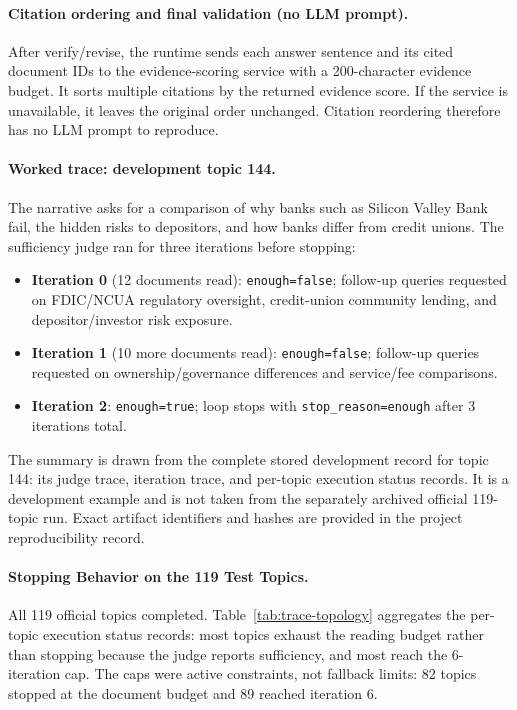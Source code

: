 \paragraph{Citation ordering and final validation (no LLM prompt).}
After verify/revise, the runtime sends each answer sentence and its
cited document IDs to the evidence-scoring service with a 200-character
evidence budget. It sorts multiple citations by the returned evidence
score. If the service is unavailable, it leaves the original order
unchanged. Citation reordering therefore has no LLM prompt to
reproduce.

\paragraph{Worked trace: development topic 144.} The narrative asks for
a comparison of why banks such as Silicon Valley Bank fail, the hidden
risks to depositors, and how banks differ from credit unions. The
sufficiency judge ran for three iterations before stopping:

\begin{itemize}
\setlength\itemsep{2pt}
\item \textbf{Iteration 0} (12 documents read): \texttt{enough=false};
follow-up queries requested on FDIC/NCUA regulatory oversight,
credit-union community lending, and depositor/investor risk exposure.
\item \textbf{Iteration 1} (10 more documents read): \texttt{enough=false};
follow-up queries requested on ownership/governance differences and
service/fee comparisons.
\item \textbf{Iteration 2}: \texttt{enough=true}; loop stops with
\texttt{stop\_reason=enough} after 3 iterations total.
\end{itemize}

The summary is drawn from the complete stored development record for topic
144: its judge trace, iteration trace, and per-topic execution status
records. It is a development example and is not taken from
the separately archived official 119-topic run. Exact artifact identifiers
and hashes are provided in the project reproducibility record.

\paragraph{Stopping Behavior on the 119 Test Topics.} All 119 official topics
completed. Table~\ref{tab:trace-topology} aggregates the per-topic
execution status records: most topics exhaust the reading budget rather
than stopping because the judge reports sufficiency, and most reach the
6-iteration cap. The caps were active constraints, not fallback limits:
82 topics stopped at the document budget and 89 reached iteration 6.

